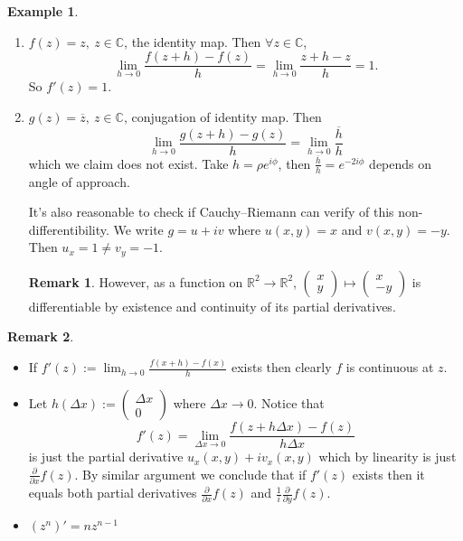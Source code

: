 \documentclass[a4paper]{article}
\theoremstyle{definition}
\newtheorem{example}[defn]{Example}
\newtheorem*{remark}{Remark}
\begin{document}
\begin{example}
\begin{enumerate}
    \item $f(z)=z,\ z\in \mathbb C$, the identity map. Then $\forall z\in \mathbb C$,
    \[
    \lim_{h\rightarrow 0} \frac{f(z+h)-f(z)}{h} = \lim_{h\rightarrow 0} \frac{z+h-z}{h} = 1.
    \]
    So $f'(z)=1$.
    \item $g(z) = \overline{z},\ z\in \mathbb C$, conjugation of identity map. Then
    \[
    \lim_{h\rightarrow 0}\frac{g(z+h)-g(z)}{h} = \lim_{h\rightarrow 0} \frac{\overline{h}}{h}
    \]
    which we claim does not exist. Take $h=\rho e^{i\phi}$, then $\frac{\overline{h}}{h} = e^{-2i\phi}$ depends on angle of approach.
    
    It's also reasonable to check if Cauchy–Riemann can verify of this non-differentibility. We write $g=u+iv$ where $u(x,y)=x$ and $v(x,y)=-y$. Then $u_x=1\neq v_y=-1$.
\begin{remark}
However, as a function on $\mathbb R^2 \rightarrow \mathbb R^2$, $\begin{pmatrix}x\\y\end{pmatrix}\mapsto \begin{pmatrix}x\\-y\end{pmatrix}$ is differentiable by existence and continuity of its partial derivatives.
\end{remark}
\end{enumerate}
\end{example}
\begin{remark}
\begin{itemize}[Demystification]
    \item If $\displaystyle f'(z):=\lim_{h\rightarrow 0} \frac{f(x+h)-f(x)}{h}$ exists then clearly $f$ is continuous at $z$.
    \item Let $h(\Delta x):=\begin{pmatrix} \Delta x \\ 0 \end{pmatrix}$ where $\Delta x \rightarrow 0$. Notice that
    \[
    f'(z)=\lim_{\Delta x \rightarrow 0} \frac{f(z+h\Delta x)-f(z)}{h\Delta x}
    \]
    is just the partial derivative $u_x(x,y)+i v_x(x,y)$ which by linearity is just $\displaystyle \frac{\partial}{\partial x} f(z)$. By similar argument we conclude that if $f'(z)$ exists then it equals both partial derivatives $\displaystyle \frac{\partial}{\partial x} f(z)$ and $\displaystyle \frac{1}{i} \frac{\partial}{\partial y} f(z)$.
    \item $(z^n)'=nz^{n-1}$
\end{itemize}
\end{remark}
\end{document}
